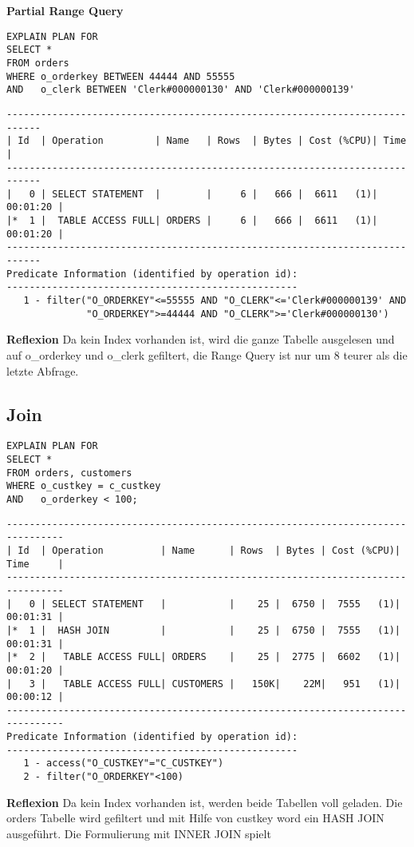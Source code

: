 \documentclass[10pt]{article}
\begin{document}
\textbf{Partial Range Query}
\begin{lstlisting}[style=sqlNoTitle]
EXPLAIN PLAN FOR
SELECT *
FROM orders
WHERE o_orderkey BETWEEN 44444 AND 55555
AND   o_clerk BETWEEN 'Clerk#000000130' AND 'Clerk#000000139'
\end{lstlisting}
\begin{lstlisting}[style=queryexecutionplan]
----------------------------------------------------------------------------
| Id  | Operation         | Name   | Rows  | Bytes | Cost (%CPU)| Time     |
----------------------------------------------------------------------------
|   0 | SELECT STATEMENT  |        |     6 |   666 |  6611   (1)| 00:01:20 |
|*  1 |  TABLE ACCESS FULL| ORDERS |     6 |   666 |  6611   (1)| 00:01:20 |
----------------------------------------------------------------------------
Predicate Information (identified by operation id):
---------------------------------------------------
   1 - filter("O_ORDERKEY"<=55555 AND "O_CLERK"<='Clerk#000000139' AND 
              "O_ORDERKEY">=44444 AND "O_CLERK">='Clerk#000000130')
\end{lstlisting}
\textbf{Reflexion} \newline
Da kein Index vorhanden ist, wird die ganze Tabelle ausgelesen und auf o\_orderkey und o\_clerk gefiltert, die Range Query ist nur um 8 teurer als die letzte Abfrage.

\subsection{Join}
\begin{lstlisting}[style=sqlNoTitle]
EXPLAIN PLAN FOR
SELECT *
FROM orders, customers
WHERE o_custkey = c_custkey
AND   o_orderkey < 100;
\end{lstlisting}
\begin{lstlisting}[style=queryexecutionplan]
--------------------------------------------------------------------------------
| Id  | Operation          | Name      | Rows  | Bytes | Cost (%CPU)| Time     |
--------------------------------------------------------------------------------
|   0 | SELECT STATEMENT   |           |    25 |  6750 |  7555   (1)| 00:01:31 |
|*  1 |  HASH JOIN         |           |    25 |  6750 |  7555   (1)| 00:01:31 |
|*  2 |   TABLE ACCESS FULL| ORDERS    |    25 |  2775 |  6602   (1)| 00:01:20 |
|   3 |   TABLE ACCESS FULL| CUSTOMERS |   150K|    22M|   951   (1)| 00:00:12 |
--------------------------------------------------------------------------------
Predicate Information (identified by operation id):
---------------------------------------------------
   1 - access("O_CUSTKEY"="C_CUSTKEY")
   2 - filter("O_ORDERKEY"<100)
\end{lstlisting}
\textbf{Reflexion} \newline
Da kein Index vorhanden ist, werden beide Tabellen voll geladen. Die orders Tabelle wird gefiltert und mit Hilfe von custkey word ein HASH JOIN ausgeführt.
Die Formulierung mit INNER JOIN spielt
\end{document}
